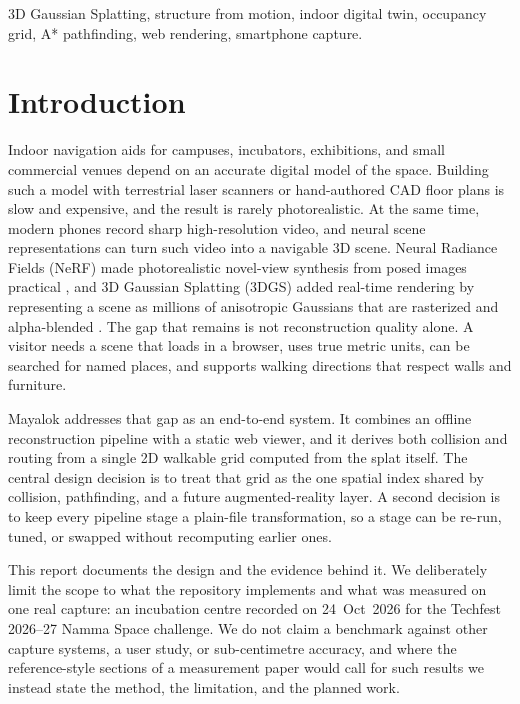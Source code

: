 \documentclass[conference]{IEEEtran}
\begin{document}
\begin{IEEEkeywords}
3D Gaussian Splatting, structure from motion, indoor digital twin, occupancy grid, A* pathfinding, web rendering, smartphone capture.
\end{IEEEkeywords}

\section{Introduction}
Indoor navigation aids for campuses, incubators, exhibitions, and small commercial venues depend on an accurate digital model of the space. Building such a model with terrestrial laser scanners or hand-authored CAD floor plans is slow and expensive, and the result is rarely photorealistic. At the same time, modern phones record sharp high-resolution video, and neural scene representations can turn such video into a navigable 3D scene. Neural Radiance Fields (NeRF) made photorealistic novel-view synthesis from posed images practical \cite{mildenhall2020nerf,barron2022mipnerf360}, and 3D Gaussian Splatting (3DGS) added real-time rendering by representing a scene as millions of anisotropic Gaussians that are rasterized and alpha-blended \cite{kerbl2023}. The gap that remains is not reconstruction quality alone. A visitor needs a scene that loads in a browser, uses true metric units, can be searched for named places, and supports walking directions that respect walls and furniture.

Mayalok addresses that gap as an end-to-end system. It combines an offline reconstruction pipeline with a static web viewer, and it derives both collision and routing from a single 2D walkable grid computed from the splat itself. The central design decision is to treat that grid as the one spatial index shared by collision, pathfinding, and a future augmented-reality layer. A second decision is to keep every pipeline stage a plain-file transformation, so a stage can be re-run, tuned, or swapped without recomputing earlier ones.

This report documents the design and the evidence behind it. We deliberately limit the scope to what the repository implements and what was measured on one real capture: an incubation centre recorded on 24~Oct~2026 for the Techfest 2026--27 Namma Space challenge. We do not claim a benchmark against other capture systems, a user study, or sub-centimetre accuracy, and where the reference-style sections of a measurement paper would call for such results we instead state the method, the limitation, and the planned work.
\end{document}
